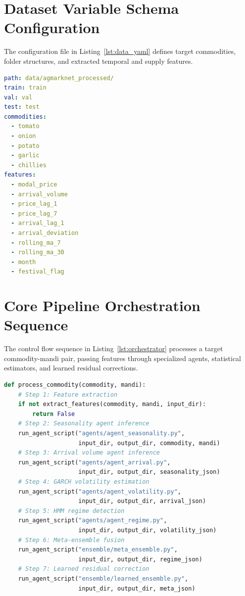 \documentclass[12pt,a4paper]{report}
\theoremstyle{definition}
\theoremstyle{remark}
\begin{document}
\section{Dataset Variable Schema Configuration}
The configuration file in Listing~\ref{lst:data_yaml} defines target commodities, folder structures, and extracted temporal and supply features.

\begin{lstlisting}[language=yaml, caption={Data configuration YAML file (data\_mandi.yaml).}, label=lst:data_yaml]
path: data/agmarknet_processed/
train: train
val: val
test: test
commodities:
  - tomato
  - onion
  - potato
  - garlic
  - chillies
features:
  - modal_price
  - arrival_volume
  - price_lag_1
  - price_lag_7
  - arrival_lag_1
  - arrival_deviation
  - rolling_ma_7
  - rolling_ma_30
  - month
  - festival_flag
\end{lstlisting}

\section{Core Pipeline Orchestration Sequence}
The control flow sequence in Listing~\ref{lst:orchestrator} processes a target commodity-mandi pair, passing features through specialized agents, statistical estimators, and learned residual corrections.

\begin{lstlisting}[language=Python, caption={Pipeline Orchestration Sequence (orchestrator.py).}, label=lst:orchestrator]
def process_commodity(commodity, mandi):
    # Step 1: Feature extraction
    if not extract_features(commodity, mandi, input_dir):
        return False
    # Step 2: Seasonality agent inference
    run_agent_script("agents/agent_seasonality.py",
                     input_dir, output_dir, commodity, mandi)
    # Step 3: Arrival volume agent inference
    run_agent_script("agents/agent_arrival.py",
                     input_dir, output_dir, seasonality_json)
    # Step 4: GARCH volatility estimation
    run_agent_script("agents/agent_volatility.py",
                     input_dir, output_dir, arrival_json)
    # Step 5: HMM regime detection
    run_agent_script("agents/agent_regime.py",
                     input_dir, output_dir, volatility_json)
    # Step 6: Meta-ensemble fusion
    run_agent_script("ensemble/meta_ensemble.py",
                     input_dir, output_dir, regime_json)
    # Step 7: Learned residual correction
    run_agent_script("ensemble/learned_ensemble.py",
                     input_dir, output_dir, meta_json)
\end{lstlisting}
\end{document}
